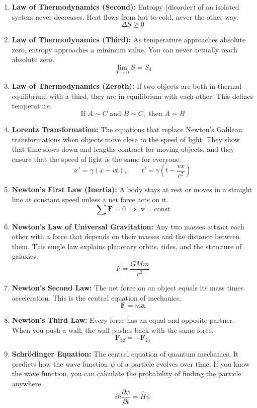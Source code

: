 \documentclass[11pt,openright]{book}
\begin{document}
\begin{enumerate}
\item \textbf{Law of Thermodynamics (Second):} Entropy (disorder) of an isolated system never decreases. Heat flows from hot to cold, never the other way.
\[
\Delta S\geq 0
\]

\item \textbf{Law of Thermodynamics (Third):} As temperature approaches absolute zero, entropy approaches a minimum value. You can never actually reach absolute zero.
\[
\lim_{T\to 0}S=S_0
\]

\item \textbf{Law of Thermodynamics (Zeroth):} If two objects are both in thermal equilibrium with a third, they are in equilibrium with each other. This defines temperature.
\[
\text{If }A\sim C\text{ and }B\sim C,\text{ then }A\sim B
\]

\item \textbf{Lorentz Transformation:} The equations that replace Newton's Galilean transformations when objects move close to the speed of light. They show that time slows down and lengths contract for moving objects, and they ensure that the speed of light is the same for everyone.
\[
x'=\gamma(x-vt),\qquad
t'=\gamma\left(t-\frac{vx}{c^2}\right)
\]

\item \textbf{Newton's First Law (Inertia):} A body stays at rest or moves in a straight line at constant speed unless a net force acts on it.
\[
\sum\mathbf F=0 \;\Rightarrow\; \mathbf v=\text{const}
\]

\item \textbf{Newton's Law of Universal Gravitation:} Any two masses attract each other with a force that depends on their masses and the distance between them. This single law explains planetary orbits, tides, and the structure of galaxies.
\[
F=\frac{GMm}{r^2}
\]

\item \textbf{Newton's Second Law:} The net force on an object equals its mass times acceleration. This is the central equation of mechanics.
\[
\mathbf F=m\mathbf a
\]

\item \textbf{Newton's Third Law:} Every force has an equal and opposite partner. When you push a wall, the wall pushes back with the same force.
\[
\mathbf F_{12}=-\mathbf F_{21}
\]

\item \textbf{Schr\"odinger Equation:} The central equation of quantum mechanics. It predicts how the wave function $\psi$ of a particle evolves over time. If you know the wave function, you can calculate the probability of finding the particle anywhere.
\[
i\hbar\frac{\partial\psi}{\partial t}=\hat H\psi
\]

\end{enumerate}
\end{document}
